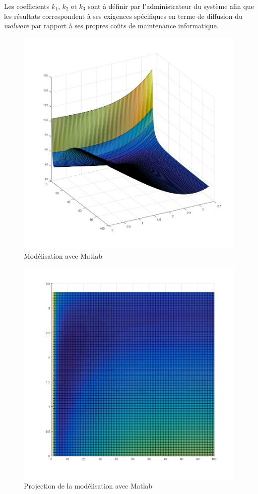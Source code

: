 Les coefficients $k_1$, $k_2$ et $k_3$ sont à définir par l'administrateur du système afin que les résultats correspondent à ses exigences spécifiques en terme de diffusion du \textit{malware} par rapport à ses propres coûts de maintenance informatique.

\begin{figure}[!ht]
\centering
     \includegraphics[width=1.0\linewidth]{Paul/Matlab/3D.jpg}
     \caption{Modélisation avec Matlab}
     \label{matlab}
\end{figure}

\begin{figure}[!ht]
\centering
     \includegraphics[width=1.0\linewidth]{Paul/Matlab/3D_proj.jpg}
     \caption{Projection de la modélisation avec Matlab}
     \label{matlab_proj}
\end{figure}

